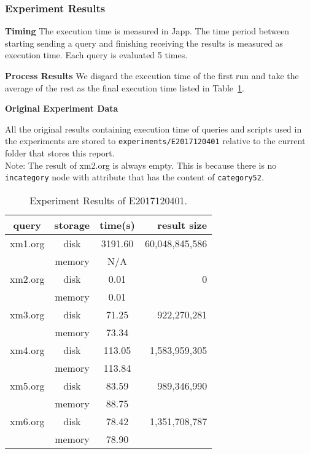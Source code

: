 \subsubsection{Experiment Results}

\textbf{Timing} The execution time is measured in Japp. The time period between
starting sending a query and finishing receiving the results is measured as
execution time. Each query is evaluated 5 times. 

\textbf{Process Results}
We disgard the execution time of the first run and take the average of the rest as
the final execution time listed in Table~\ref{table:E2017120401_1}.


\textbf{Original Experiment Data}

All the original results containing execution time of queries and scripts used 
in the experiments  are stored to \texttt{experiments/E2017120401} relative to
the current folder that stores this report.\\

Note: The result of xm2.org is always empty. This is because there is no \texttt{incategory} node 
with attribute that has the content of \texttt{category52}. 


\begin{table}[t]
	\caption{Experiment Results of E2017120401.}
	\label{table:E2017120401_1}
	\centering
	\begin{tabular}{c|c|c|r}
 		\hline \hline
 query  & storage & time(s)  &   result size  \\
 \hline \hline
 xm1.org &  disk   & 3191.60  & 60,048,845,586 \\
         & memory  &    N/A   &  \\
 \hline
 xm2.org &  disk   &    0.01  &              0 \\
         & memory  &    0.01  &  \\
  \hline
 xm3.org &  disk   &  71.25  &    922,270,281 \\
         & memory  &  73.34  &  \\
  \hline
 xm4.org &  disk   &  113.05  &  1,583,959,305 \\
         & memory  &  113.84  &  \\
  \hline
 xm5.org &  disk   &  83.59  &    989,346,990 \\
         & memory  &  88.75   &   \\
  \hline
 xm6.org &  disk   &  78.42   &  1,351,708,787 \\
         & memory  &  78.90   &   \\
 \hline \hline
	\end{tabular}
\end{table}





